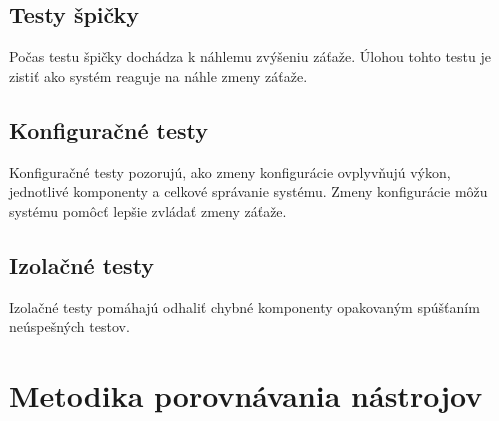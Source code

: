 \documentclass[12pt,oneside,final]{fithesis-utf8}
\begin{document}
\section{Testy špičky}
Počas testu špičky dochádza k náhlemu zvýšeniu záťaže. Úlohou tohto testu je zistiť ako systém reaguje na náhle zmeny záťaže. 

\section{Konfiguračné testy}
Konfiguračné testy pozorujú, ako zmeny konfigurácie ovplyvňujú výkon, jednotlivé komponenty a celkové správanie systému. Zmeny konfigurácie môžu systému pomôcť lepšie zvládať zmeny záťaže.

\section{Izolačné testy}
Izolačné testy pomáhajú odhaliť chybné komponenty opakovaným spúšťaním neúspešných testov.


\chapter{Metodika porovnávania nástrojov}
\end{document}
